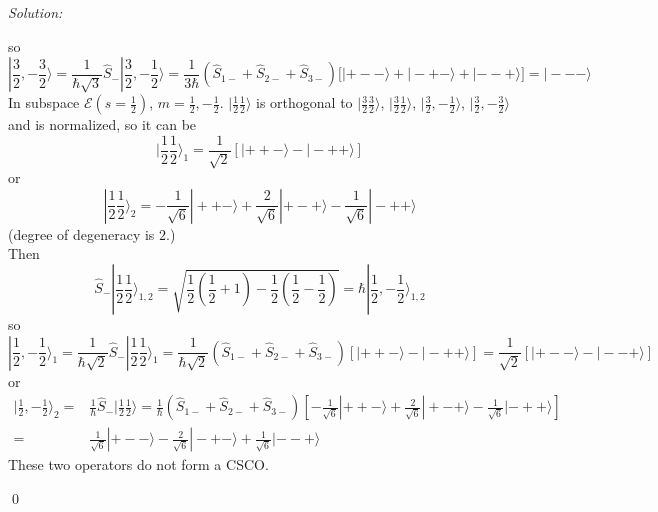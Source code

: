 \documentclass[10pt,a4paper]{article}
\newenvironment{sol}
    {\emph{Solution:}
    }
    {
    \qed
    }
\begin{document}
\begin{sol}
\begin{equation}
\end{equation}
so
\begin{equation}
|\frac{3}{2},-\frac{3}{2}\rangle=\frac{1}{\hbar\sqrt{3}}\hat{S}_-|\frac{3}{2},-\frac{1}{2}\rangle=\frac{1}{3\hbar}(\hat{S}_{1-}+\hat{S}_{2-}+\hat{S}_{3-})[|+--\rangle+|-+-\rangle+|--+\rangle]=|---\rangle
\end{equation}
In subspace $\mathscr{E}(s=\frac{1}{2})$, $m=\frac{1}{2},-\frac{1}{2}$. $|\frac{1}{2}\frac{1}{2}\rangle$ is orthogonal to $|\frac{3}{2}\frac{3}{2}\rangle$, $|\frac{3}{2}\frac{1}{2}\rangle$, $|\frac{3}{2},-\frac{1}{2}\rangle$, $|\frac{3}{2},-\frac{3}{2}\rangle$ and is normalized, so it can be
\begin{equation}
|\frac{1}{2}\frac{1}{2}\rangle_1=\frac{1}{\sqrt{2}}[|++-\rangle-|-++\rangle]
\end{equation}
or
\begin{equation}
|\frac{1}{2}\frac{1}{2}\rangle_2=-\frac{1}{\sqrt{6}}|++-\rangle+\frac{2}{\sqrt{6}}|+-+\rangle-\frac{1}{\sqrt{6}}|-++\rangle
\end{equation}
(degree of degeneracy is $2$.)\\
Then
\begin{equation}
\hat{S}_-|\frac{1}{2}\frac{1}{2}\rangle_{1,2}=\sqrt{\frac{1}{2}(\frac{1}{2}+1)-\frac{1}{2}(\frac{1}{2}-\frac{1}{2})}=\hbar|\frac{1}{2},-\frac{1}{2}\rangle_{1,2}
\end{equation}
so
\begin{equation}
|\frac{1}{2},-\frac{1}{2}\rangle_1=\frac{1}{\hbar\sqrt{2}}\hat{S}_-|\frac{1}{2}\frac{1}{2}\rangle_1=\frac{1}{\hbar\sqrt{2}}(\hat{S}_{1-}+\hat{S}_{2-}+\hat{S}_{3-})[|++-\rangle-|-++\rangle]=\frac{1}{\sqrt{2}}[|+--\rangle-|--+\rangle]
\end{equation}
or
\begin{align}
\nonumber|\frac{1}{2},-\frac{1}{2}\rangle_2=&\frac{1}{\hbar}\hat{S}_-|\frac{1}{2}\frac{1}{2}\rangle=\frac{1}{\hbar}(\hat{S}_{1-}+\hat{S}_{2-}+\hat{S}_{3-})[-\frac{1}{\sqrt{6}}|++-\rangle+\frac{2}{\sqrt{6}}|+-+\rangle-\frac{1}{\sqrt{6}}|-++\rangle]\\
=&\frac{1}{\sqrt{6}}|+--\rangle-\frac{2}{\sqrt{6}}|-+-\rangle+\frac{1}{\sqrt{6}}|--+\rangle
\end{align}
These two operators do not form a CSCO.
\end{sol}
\end{document}
